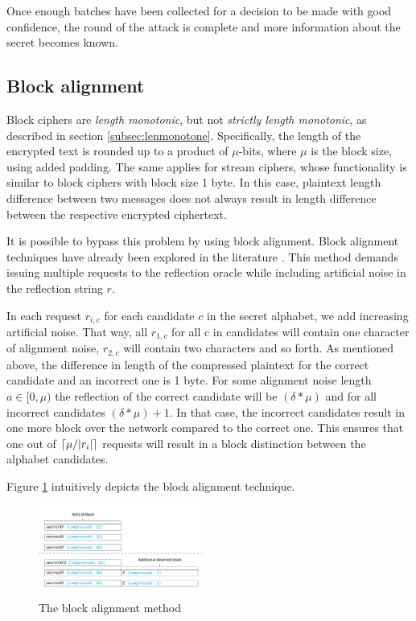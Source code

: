 \documentclass[conference, letterpaper, 10pt]{IEEEtran}
\DeclarePairedDelimiter{\ceil}{\lceil}{\rceil}
\begin{document}
Once enough batches have been collected for a decision to be made with good
confidence, the round of the attack is complete and more information about the
secret becomes known.

\subsection{Block alignment}\label{subsec:blockalign}
Block ciphers are \textit{length monotonic}, but not \textit{strictly length
monotonic}, as described in section \ref{subsec:lenmonotone}. Specifically, the
length of the encrypted text is rounded up to a product of $\mu$-bits, where $\mu$
is the block size, using added padding. The same applies for stream ciphers,
whose functionality is similar to block ciphers with block size 1 byte. In this
case, plaintext length difference between two messages does not always result in
length difference between the respective encrypted ciphertext.

It is possible to bypass this problem by using block alignment. Block alignment
techniques have already been explored in the literature \cite{c10}. This method
demands issuing multiple requests to the reflection oracle while including
artificial noise in the reflection string $r$.

In each request $r_{i, c}$ for each candidate $c$ in the secret alphabet, we add
increasing artificial noise. That way, all $r_{1, c}$ for all c in candidates
will contain one character of alignment noise, $r_{2, c}$ will contain two
characters and so forth. As mentioned above, the difference in length of the
compressed plaintext for the correct candidate and an incorrect one is 1 byte.
For some alignment noise length $a \in [0, \mu)$ the reflection of the correct
candidate will be $(\delta*\mu)$ and for all incorrect candidates
$(\delta*\mu)+1$. In that case, the incorrect candidates result in one more
block over the network compared to the correct one.  This ensures that one out
of $\ceil{\mu / |r_i|}$ requests will result in a block distinction between the
alphabet candidates.

Figure \ref{fig:block_alignment} intuitively depicts the block alignment technique.

   \begin{figure}[thpb]
      \centering
          \includegraphics[width=0.48\textwidth]{block_alignment.png}
      \caption{The block alignment method}
      \label{fig:block_alignment}
   \end{figure}
\end{document}
